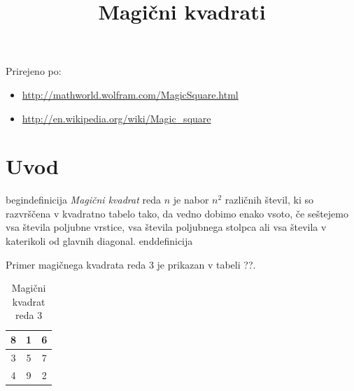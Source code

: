 \documentclass[a4paper,12pt]{article}
\date{}
\title{Magični kvadrati}
\begin{document}
\maketitle

Prirejeno po:

\begin{itemize}
   \item \url{http://mathworld.wolfram.com/MagicSquare.html}
   \item \url{http://en.wikipedia.org/wiki/Magic_square}
\end{itemize}

\tableofcontents

\newpage

\section{Uvod}

 begin{definicija}
   \emph{Magični kvadrat} reda \(n\) je nabor \(n^2\) različnih števil,
   ki so razvrščena v kvadratno tabelo tako, da vedno dobimo enako vsoto,
   če seštejemo vsa števila poljubne vrstice, vsa števila poljubnega
   stolpca ali vsa števila v katerikoli od glavnih diagonal.
 end{definicija}

Primer magičnega kvadrata reda 3 je prikazan v tabeli ??. %

   
   
   \begin{table}
      \centering
      \caption{Magični kvadrat reda 3}
      \label{table:mag3}
      \large
      \begin{tabular}{|c|c|c|}\hline
         8 & 1 & 6 \\\hline
         3 & 5 & 7 \\\hline
         4 & 9 & 2 \\\hline
      \end{tabular}
      \normalsize
   \end{table}
\end{document}

